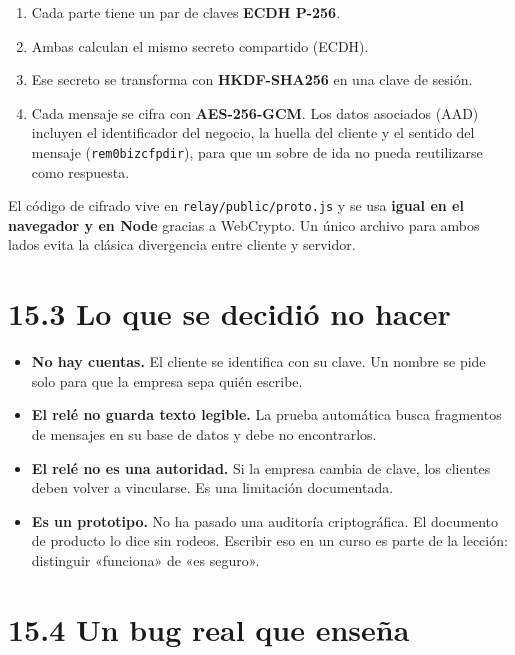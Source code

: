 \begin{enumerate}
\def\labelenumi{\arabic{enumi}.}
\tightlist
\item
  Cada parte tiene un par de claves \textbf{ECDH P-256}.
\item
  Ambas calculan el mismo secreto compartido (ECDH).
\item
  Ese secreto se transforma con \textbf{HKDF-SHA256} en una clave de sesión.
\item
  Cada mensaje se cifra con \textbf{AES-256-GCM}. Los datos asociados (AAD) incluyen el identificador del negocio, la huella del cliente y el sentido del mensaje (\texttt{rem0\textbar{}biz\textbar{}cfp\textbar{}dir}), para que un sobre de ida no pueda reutilizarse como respuesta.
\end{enumerate}

El código de cifrado vive en \texttt{relay/public/proto.js} y se usa \textbf{igual en el navegador y en Node} gracias a WebCrypto. Un único archivo para ambos lados evita la clásica divergencia entre cliente y servidor.

\section{15.3 Lo que se decidió no hacer}\label{lo-que-se-decidiuxf3-no-hacer}

\begin{itemize}
\tightlist
\item
  \textbf{No hay cuentas.} El cliente se identifica con su clave. Un nombre se pide solo para que la empresa sepa quién escribe.
\item
  \textbf{El relé no guarda texto legible.} La prueba automática busca fragmentos de mensajes en su base de datos y debe no encontrarlos.
\item
  \textbf{El relé no es una autoridad.} Si la empresa cambia de clave, los clientes deben volver a vincularse. Es una limitación documentada.
\item
  \textbf{Es un prototipo.} No ha pasado una auditoría criptográfica. El documento de producto lo dice sin rodeos. Escribir eso en un curso es parte de la lección: distinguir «funciona» de «es seguro».
\end{itemize}

\section{15.4 Un bug real que enseña}\label{un-bug-real-que-enseuxf1a}

